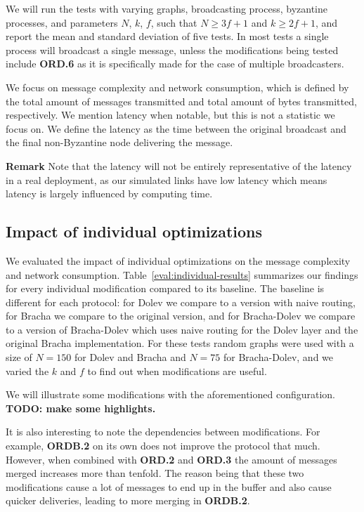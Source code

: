 We will run the tests with varying graphs, broadcasting process, byzantine processes, and parameters $N$, $k$, $f$, such that $N \ge 3f+1$ and $k \ge 2f+1$, and report the mean and standard deviation of five tests. In most tests a single process will broadcast a single message, unless the modifications being tested include \textbf{ORD.6} as it is specifically made for the case of multiple broadcasters.

We focus on message complexity and network consumption, which is defined by the total amount of messages transmitted and total amount of bytes transmitted, respectively. We mention latency when notable, but this is not a statistic we focus on. We define the latency as the time between the original broadcast and the final non-Byzantine node delivering the message. 

\textbf{Remark}
Note that the latency will not be entirely representative of the latency in a real deployment, as our simulated links have low latency which means latency is largely influenced by computing time. 

\subsection{Impact of individual optimizations}
We evaluated the impact of individual optimizations on the message complexity and network consumption. Table~\ref{eval:individual-results} summarizes our findings for every individual modification compared to its baseline. The baseline is different for each protocol: for Dolev we compare to a version with naive routing, for Bracha we compare to the original version, and for Bracha-Dolev we compare to a version of Bracha-Dolev which uses naive routing for the Dolev layer and the original Bracha implementation. For these tests random graphs were used with a size of $N=150$ for Dolev and Bracha and $N=75$ for Bracha-Dolev, and we varied the $k$ and $f$ to find out when modifications are useful. 

We will illustrate some modifications with the aforementioned configuration. \textbf{TODO: make some highlights.}

It is also interesting to note the dependencies between modifications. For example, \textbf{ORDB.2} on its own does not improve the protocol that much. However, when combined with \textbf{ORD.2} and \textbf{ORD.3} the amount of messages merged increases more than tenfold. The reason being that these two modifications cause a lot of messages to end up in the buffer and also cause quicker deliveries, leading to more merging in \textbf{ORDB.2}.

